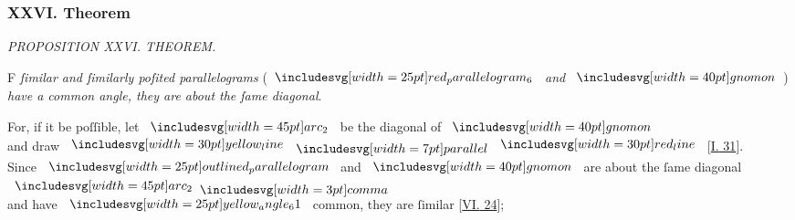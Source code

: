 \documentclass[11pt,preview]{standalone}
\begin{document}
\subsubsection{XXVI. Theorem}

\begin{minipage}[t]{0.54\textwidth}
    \begin{center}
        \textit{PROPOSITION XXVI. THEOREM.}\label{book6pr26} \\
    \end{center}

    \hfill

    \begin{center}
        \raggedright \lettrine[lines=3, loversize=1, nindent=0pt]{}{}F \textit{ſimilar and ſimilarly poſited parallelograms} (\hspace{-1ex}$\img{red_parallelogram_6}$ \textit{and} $\img[0][0][40]{gnomon}$\hspace{-1ex}) \textit{have a common angle, they are about the ſame diagonal}.
    \end{center}
\end{minipage}%
\hfill
\begin{minipage}[t]{0.43\textwidth}
    \vspace{0pt}
    
\end{minipage}%

\hfill

\hfill

\begin{center}
    For, if it be poſſible, let $\img[0][0][45]{arc_2}$ be the diagonal of $\img[0][0][40]{gnomon}$\\
    and draw $\yellowline \bparallel \redline$ [\hyperref[book1pr31]{\textsc{I.} 31}].\\
    Since $\img{outlined_parallelogram}$ and $\img[0][0][40]{gnomon}$ are about the ſame
    diagonal $\img[0][0][45]{arc_2} \bcomma$\\
    and have $\img{yellow_angle_61}$ common, they are ſimilar [\hyperref[book6pr24]{\textsc{VI.} 24}];
\end{center}
\end{document}
